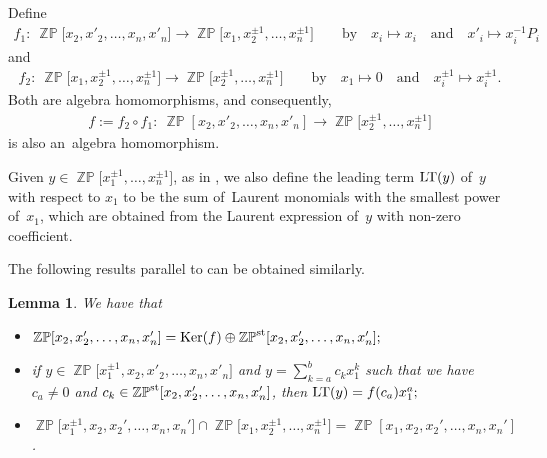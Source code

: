 \documentclass[pdftex]{sigma}
\numberwithin{equation}{section}
\newtheorem{Lemma}[Theorem]{Lemma}
\begin{document}
Define
\begin{gather*}
f_1\colon\ \mathop{\mathbb{ZP}}\big[x_{2},x'_{2},\ldots,x_n,x'_{n}]\rightarrow \mathop{\mathbb{ZP}}[x_1,x^{\pm1}_2,\ldots,x^{\pm1}_{n}\big]\qquad \text{by}\quad
x_i\mapsto x_i \quad\text{and}\quad x'_{i}\mapsto x_{i}^{-1}P_i
\end{gather*}
and
\begin{gather*}
f_2\colon\ \mathop{\mathbb{ZP}}\big[x_{1},x^{\pm1}_{2},\ldots,x^{\pm1}_{n}\big]\rightarrow \mathop{\mathbb{ZP}}\big[x^{\pm1}_2,\ldots,x^{\pm1}_{n}\big]\qquad \text{by}\quad
x_1\mapsto 0 \quad\text{and} \quad x_{i}^{\pm1}\mapsto x_{i}^{\pm1}.
\end{gather*}
Both are algebra homomorphisms, and consequently,
\begin{gather*}
f:=f_2\circ f_1\colon\ \mathop{\mathbb{ZP}}[x_{2},x'_{2},\ldots,x_n,x'_{n}]\rightarrow \mathop{\mathbb{ZP}}\big[x^{\pm1}_2,\ldots,x^{\pm1}_{n}\big]
\end{gather*}
is also an~algebra homomorphism.

Given $y\in\mathop{\mathbb{ZP}}\!\big[x^{\pm1}_1,\ldots, x^{\pm1}_{n}\big]$, as in \cite[Definition~6.3]{bfz}, we also define the leading term $\mathop{\rm LT}(y)$ of~$y$ with respect to $x_1$ to be the sum of~Laurent monomials with the smallest power of~$x_1$, which are obtained from the Laurent expression of~$y$ with non-zero coefficient.

The following results parallel to \cite[Lemmas 6.2,~6.4 and~6.5]{bfz} can be obtained similarly.
\begin{Lemma}\label{lemdirectsum}
We have that
\begin{itemize}\itemsep=0pt
 \item[{\rm (1)}] $\mathop{\mathbb{ZP}}[x_{2},x'_{2},\ldots,x_n,x'_{n}]={\rm Ker}(f)\oplus \mathop{\mathbb{ZP}}\nolimits^{\rm st}[x_{2},x'_{2},\ldots,x_n,x'_{n}];$
 \item[{\rm (2)}] if $y\in\mathop{\mathbb{ZP}}\!\big[x^{\pm1}_1,x_2,x'_2,\ldots,x_n,x'_{n}\big]$ and $y=\sum\limits_{k=a}^{b}c_kx_{1}^{k}$ such that we have $c_a\neq0$ and $c_k\in \mathop{\mathbb{ZP}}\nolimits^{\rm{st}}[x_2,x'_2,\ldots,x_n,x'_{n}]$, then ${\rm LT}(y)=f(c_a)x_{1}^{a};$
\item[{\rm (3)}] $\mathop{\mathbb{ZP}}\!\big[x_{1}^{\pm1},x_{2},x_{2}',\ldots,x_{n},x_{n}'\big] \cap \mathop{\mathbb{ZP}}\!\big[x_{1},x_{2}^{\pm1},\ldots,x_{n}^{\pm1}\big] =\mathop{\mathbb{ZP}}[x_{1},x_{2},x_{2}',\ldots,x_{n},x_{n}']$.
\end{itemize}
\end{Lemma}
\end{document}
